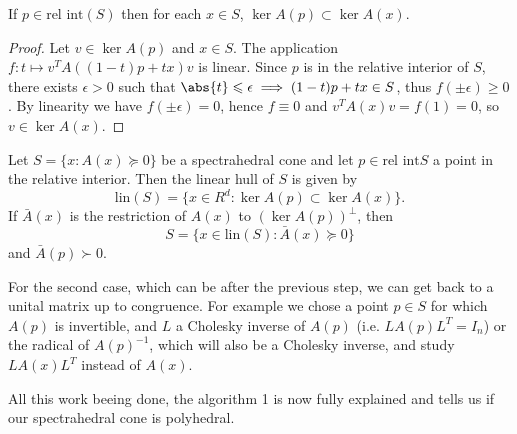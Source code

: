 \documentclass[english, mathematiques, theoremes, diagrammes, dessin, a4paper, margin = 2cm]{article-perso}
\begin{document}
\begin{proposition}
	If $p \in \text{rel int} (S)$ then for each $x \in S$, $\ker A(p) \subset \ker A(x)$.
\end{proposition}
\begin{proof}
	Let $v \in \ker A(p)$ and $x \in S$. The application $f: t \mapsto v^T A((1-t)p + tx)v$ is linear. Since $p$ is in the relative interior of $S$, there exists $\epsilon >0$ such that $\abs{t } \leqslant \epsilon  \implies (1-t)p + tx \in S$, thus $f(\pm\epsilon) \geqslant 0$. By linearity we have $f(\pm\epsilon) = 0$, hence $f \equiv  0$ and $v^T A(x) v = f(1) = 0 $, so $v \in \ker A(x)$.
\end{proof}

\begin{corollary}
	Let $S =\{x : A(x) \succcurlyeq  0 \}$ be a spectrahedral cone and let $p \in \text{rel int} S$ a point in the relative interior. Then the linear hull of $S$ is given by
	\[\text{lin} (S) = \{ x \in R^d : \ker A(p) \subset \ker A(x)\}.\]
	If $\bar{A}(x)$ is the restriction of $A(x)$ to $(\ker A(p))^\bot$, then
	\[S = \{ x \in \text{lin} (S) : \bar{A}(x) \succcurlyeq 0\}\]
and $\bar{A} (p) \succ 0$.
\end{corollary}

For the second case, which can be after the previous step, we can get back to a unital matrix up to congruence. For example we chose a point $p \in S$ for which $A(p)$ is invertible, and $L$ a Cholesky inverse of $A(p)$ (i.e. $L A(p) L^T = I_n$) or the radical of $A(p)^{-1}$, which will also be a Cholesky inverse, and study $LA(x)L^T$ instead of $A(x)$.
\medskip

All this work beeing done, the algorithm 1 is now fully explained and tells us if our spectrahedral cone is polyhedral.



\end{document}
